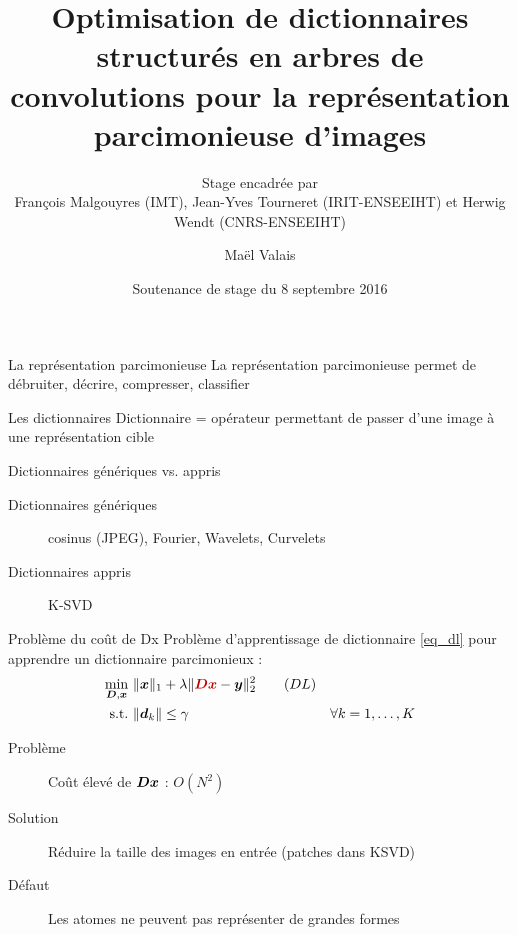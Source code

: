 


\title{Optimisation de dictionnaires structurés en arbres de convolutions pour la représentation parcimonieuse d'images}
\subtitle{Stage encadrée par\\François Malgouyres (IMT), Jean-Yves Tourneret (IRIT-ENSEEIHT) et Herwig Wendt (CNRS-ENSEEIHT)}

\date{Soutenance de stage du 8 septembre 2016}
\author{Maël Valais}



\maketitle



\begin{frame}[label=LO]{La représentation parcimonieuse}
La \alert{représentation parcimonieuse} permet de débruiter, décrire, compresser, classifier
\end{frame}


\begin{frame}{Les dictionnaires}
Dictionnaire = opérateur permettant de passer d'une image à une représentation cible

\end{frame}


\begin{frame}{Dictionnaires génériques vs. appris}
\begin{description}
	\item[Dictionnaires génériques] cosinus (JPEG), Fourier, Wavelets, Curvelets
	\item[Dictionnaires appris] K-SVD
\end{description}
\end{frame}


\begin{frame}{Problème du coût de Dx}
Problème d'apprentissage de dictionnaire \eqref{eq_dl} pour apprendre un dictionnaire parcimonieux :
\begin{align} 
\underset{\D,\x}{\min}~ & \| \x \|_1 + \lambda \| \Req{\D\x}-\y \|^2_2 \tag{$DL$}\label{eq_dl} \\
\text{s.t.}~ & \| \d_k \| \le \gamma & \forall k = 1,\dots,K\label{eq_dl_finite_norm} \notag
\end{align}
\begin{description}
	\item[Problème] Coût élevé de $\bm{D}\bm{x}$ : \alert{$O(N^2)$}
	\item[Solution] Réduire la taille des images en entrée (patches dans KSVD)
	\item[Défaut] Les atomes ne peuvent pas représenter de grandes formes
\end{description}
\end{frame}


